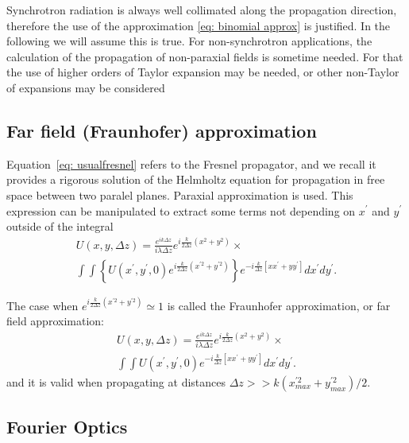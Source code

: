 \documentclass{iucr}              %
\begin{document}
Synchrotron radiation is always well collimated along the propagation direction, therefore the use of the approximation \ref{eq: binomial approx} is justified. In the following we will assume this is true. For non-synchrotron applications, the calculation of the propagation of non-paraxial fields is sometime needed. For that the use of higher orders of Taylor expansion may be needed, or other non-Taylor of expansions may be considered \cite{Mansuripur,Avoort}


%
%

\subsection{Far field (Fraunhofer) approximation}

Equation~\ref{eq: usualfresnel} refers to the Fresnel propagator, and we recall it provides a rigorous solution of the Helmholtz equation for propagation in free space between two paralel planes. Paraxial approximation is used. This expression can be manipulated to extract some terms not depending on $x^\prime$ and $y^\prime$ outside of the integral
\begin{multline}\label{eq: before fraunhoffer}
U(x,y, \Delta z) = \frac {e^{ik\Delta z }}{ i \lambda \Delta z}  e^{ i \frac{k}{2 \Delta z} (x^2 + y^2) } \times \\
\int \int \left\{ U(x^\prime, y^\prime, 0) e^{i \frac{k}{2 \Delta z} (x^{\prime 2} + y^{\prime 2} )} \right\} e^{-i \frac{k}{\Delta z} [x  x^\prime + y y^\prime]} dx^\prime dy^\prime .
\end{multline}


The case when $e^{i \frac{k}{2 \Delta z} (x^{\prime 2} + y^{\prime 2} )} \simeq 1$ is called the Fraunhofer approximation, or far field approximation:
\begin{multline}\label{eq: fraunhoffer}
U(x,y, \Delta z) = \frac {e^{ik\Delta z }}{ i \lambda \Delta z}  e^{ i \frac{k}{2 \Delta z} (x^2 + y^2) } \times \\
\int \int  U(x^\prime, y^\prime, 0)  e^{-i \frac{k}{\Delta z} [x  x^\prime + y y^\prime]} dx^\prime dy^\prime .
\end{multline}
and it is valid when propagating at distances $\Delta z >>k (x^{\prime 2}_{max} + y^{\prime 2}_{max})/2 $.  


\subsection{Fourier Optics}
\end{document}
